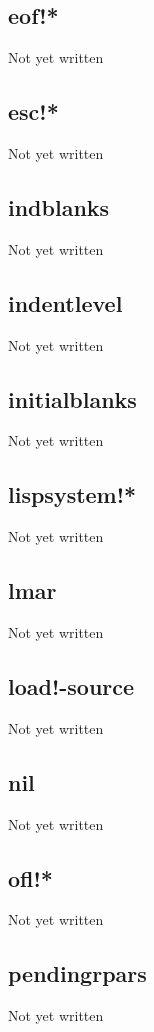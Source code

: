 \documentclass[a4paper,11pt]{article}
\begin{document}
\subsection{\ttfamily eof!*}
   Not yet written

\subsection{\ttfamily esc!*}
   Not yet written

\subsection{\ttfamily indblanks}
   Not yet written

\subsection{\ttfamily indentlevel}
   Not yet written

\subsection{\ttfamily initialblanks}
   Not yet written

\subsection{\ttfamily lispsystem!*}
   Not yet written

\subsection{\ttfamily lmar}
   Not yet written

\subsection{\ttfamily load!-source}
   Not yet written

\subsection{\ttfamily nil}
   Not yet written

\subsection{\ttfamily ofl!*}
   Not yet written

\subsection{\ttfamily pendingrpars}
   Not yet written
\end{document}
